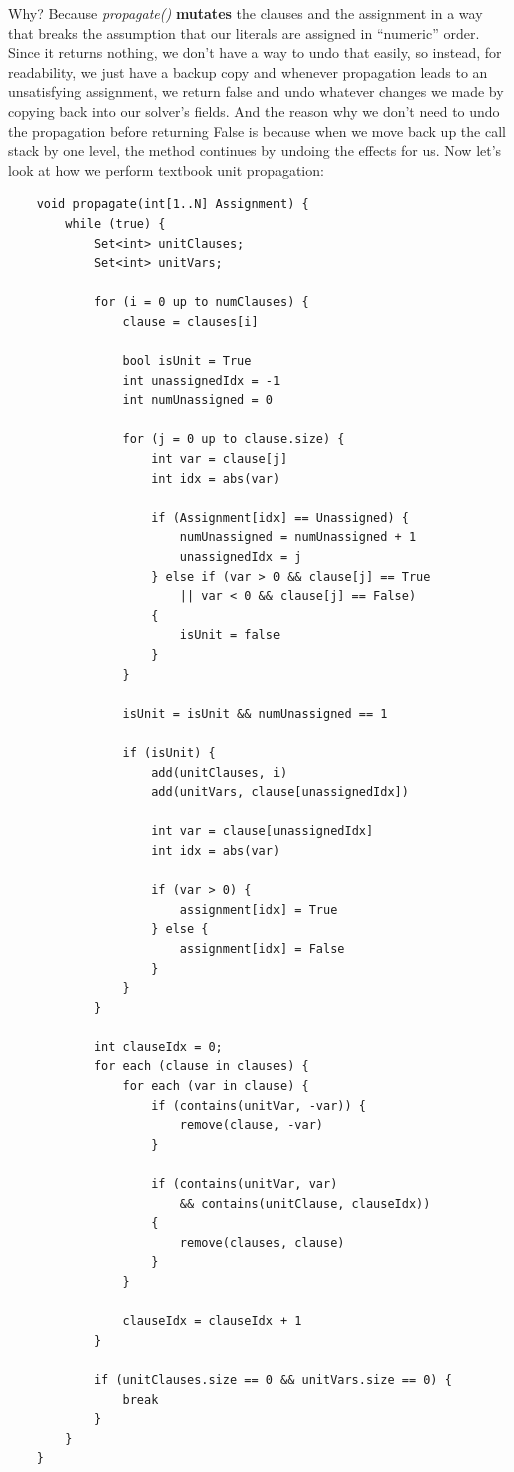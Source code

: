 \documentclass[oneside]{book}
\begin{document}
Why? Because \textit{propagate()} \textbf{mutates} the clauses and the assignment in a way 
that breaks the assumption that our literals are assigned in ``numeric'' order. Since it 
returns nothing, we don't have a way to undo that easily, so instead, for readability, 
we just have a backup copy and whenever propagation leads to an unsatisfying assignment, 
we return false and undo whatever changes we made by copying back into our solver's fields.
And the reason why we don't need to undo the propagation before returning False is because 
when we move back up the call stack by one level, the method continues by undoing the effects for us.
Now let's look at how we perform textbook unit propagation:

\begin{lstlisting}
    void propagate(int[1..N] Assignment) {
        while (true) {
            Set<int> unitClauses;
            Set<int> unitVars;

            for (i = 0 up to numClauses) {
                clause = clauses[i]

                bool isUnit = True
                int unassignedIdx = -1
                int numUnassigned = 0

                for (j = 0 up to clause.size) {
                    int var = clause[j]
                    int idx = abs(var)

                    if (Assignment[idx] == Unassigned) {
                        numUnassigned = numUnassigned + 1
                        unassignedIdx = j
                    } else if (var > 0 && clause[j] == True 
                        || var < 0 && clause[j] == False)
                    {
                        isUnit = false
                    }
                }

                isUnit = isUnit && numUnassigned == 1

                if (isUnit) {
                    add(unitClauses, i)
                    add(unitVars, clause[unassignedIdx])

                    int var = clause[unassignedIdx]
                    int idx = abs(var)

                    if (var > 0) {
                        assignment[idx] = True
                    } else {
                        assignment[idx] = False
                    }
                }
            }

            int clauseIdx = 0;
            for each (clause in clauses) {
                for each (var in clause) {
                    if (contains(unitVar, -var)) {
                        remove(clause, -var)
                    }

                    if (contains(unitVar, var) 
                        && contains(unitClause, clauseIdx))
                    {
                        remove(clauses, clause)
                    }
                }

                clauseIdx = clauseIdx + 1
            }

            if (unitClauses.size == 0 && unitVars.size == 0) {
                break
            }
        }
    }
\end{lstlisting}
\end{document}
